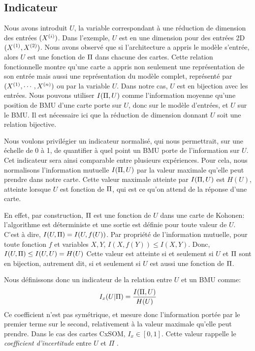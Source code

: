 \subsection{Indicateur}

Nous avons introduit $U$, la variable correspondant à une réduction de dimension des entrées $(X^{({i})})$. Dans l'exemple, $U$ est en une dimension pour des entrées 2D $(X^{({1})},X^{({2})})$.
Nous avons observé que si l'architecture a appris le modèle s'entrée, alors $U$ est une fonction de $\Pi$ dans chacune des cartes.
Cette relation fonctionnelle montre qu'une carte a appris non seulement une représentation de son entrée mais aussi une représentation du modèle complet, représenté par $(X^{({1})},\cdots,X^{({n})})$ ou par la variable $U$.
Dans notre cas, $U$ est en bijection avec les entrées. 
Nous pouvons utiliser $I(\Pi, U)$ comme l'information moyenne qu'une position de BMU d'une carte porte sur $U$, donc sur le modèle d'entrées, et $U$ sur le BMU. 
Il est nécessaire ici que la réduction de dimension donnant $U$ soit une relation bijective.

Nous voulons privilégier un indicateur normalisé, qui nous permettrait, sur une échelle de 0 à 1, de quantifier à quel point un BMU porte de l'information sur $U$. Cet indicateur sera ainsi comparable entre plusieurs expériences.
Pour cela, nous normalisons l'information mutuelle $I(\Pi,U)$  par la valeur maximale qu'elle peut prendre dans notre carte. Cette valeur maximale atteinte par $I(\Pi,U)$ est $H(U)$, atteinte lorsque $U$ est fonction de $\Pi$, qui est ce qu'on attend de la réponse d'une carte.

En effet, par construction, $\Pi$ est une fonction de $U$ dans une carte de Kohonen: l'algorithme est déterministe et une sortie est définie pour toute valeur de $U$. C'est à dire, $I(U,\Pi) = I (U, f(U))$.
Par propriété de l'information mutuelle, pour toute fonction $f$ et variables $X,Y$, $I(X,f(Y)) \leq I(X,Y) $. 
Donc, $I(U,\Pi) \leq I(U,U) = H(U)$
Cette valeur est atteinte si et seulement si $U$ et $\Pi$ sont en bijection, autrement dit, si et seulement si $U$ est aussi une fonction de $\Pi$.

Nous définissons donc un indicateur de la relation entre $U$ et un BMU comme:
\begin{equation}
I_x(U|\Pi) = \frac{I(\Pi,U)}{H(U)}
\end{equation}
Ce coefficient n'est pas symétrique, et mesure donc l'information portée par le premier terme sur le second, relativement à la valeur maximale qu'elle peut prendre. Dans le cas des cartes CxSOM, $I_x \in [0,1]$. Cette valeur rappelle le \emph{coefficient d'incertitude} entre $U$ et $\Pi$ \cite{Theil1961EconomicFA}.


